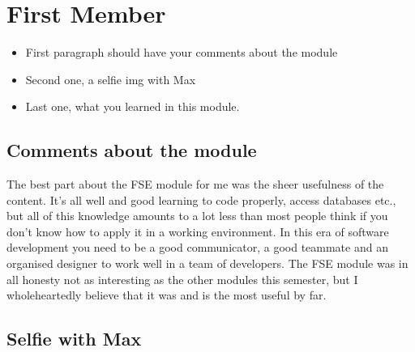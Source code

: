 \section{First Member}
\begin{itemize}
	\item First paragraph should have your comments about the module
	\item Second one, a selfie img with Max
	\item Last one, what you learned in this module.
\end{itemize}

\subsection{Comments about the module}
The best part about the FSE module for me was the sheer usefulness of the content. It's all well and good learning to code properly, access databases etc., but all of this knowledge amounts to a lot less than most people think if you don't know how to apply it in a working environment. In this era of software development you need to be a good communicator, a good teammate and an organised designer to work well in a team of developers. The FSE module was in all honesty not as interesting as the other modules this semester, but I wholeheartedly believe that it was and is the most useful by far.

\subsection{Selfie with Max}



